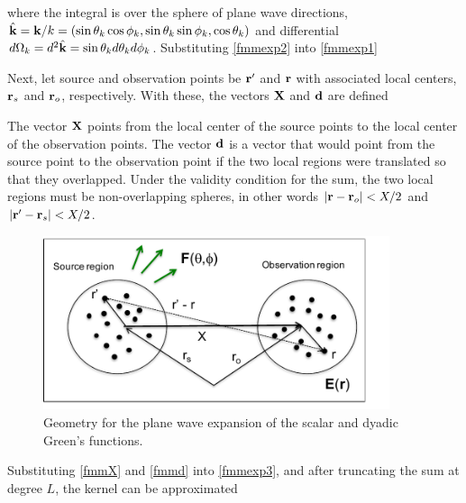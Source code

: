 \noindent where the integral is over the sphere of plane wave directions, $\hat{\mathbf{k}} = \mathbf{k}/k = (\sin\theta_k\cos\phi_k, \sin\theta_k\sin\phi_k, \cos\theta_k)$ and differential $d\Omega_k = d^2\hat{\mathbf{k}} = \sin\theta_k d\theta_k d\phi_k$.  Substituting \eqref{fmmexp2} into \eqref{fmmexp1}


Next, let source and observation points be $\mathbf{r}'$ and $\mathbf{r}$ with associated local centers, $\mathbf{r}_s$ and $\mathbf{r}_o$, respectively.  With these, the vectors $\mathbf{X}$ and $\mathbf{d}$ are defined 

The vector $\mathbf{X}$ points from the local center of the source points to the local center of the observation points. The vector $\mathbf{d}$ is a vector that would point from the source point to the observation point if the two local regions were translated so that they overlapped.  Under the validity condition for the sum, the two local regions must be non-overlapping spheres, in other words $\vert \mathbf{r} - \mathbf{r}_o \vert < X/2$ and $\vert \mathbf{r}' - \mathbf{r}_s \vert < X/2$.


 \begin{figure}[H] 
   \centering
   \includegraphics[width=4in]{FastMultipoleMethod/Figures/fmmgreens} 
   \caption{Geometry for the plane wave expansion of the scalar and dyadic Green's functions.}
   \label{}
\end{figure}


Substituting \eqref{fmmX} and \eqref{fmmd} into \eqref{fmmexp3}, and after truncating the sum at degree $L$, the kernel can be approximated  

